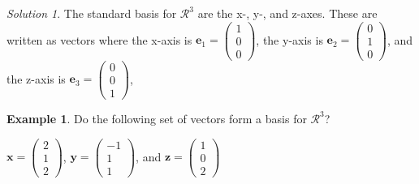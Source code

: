 \documentclass[
]{book}
\theoremstyle{definition}
\theoremstyle{definition}
\newtheorem{example}{Example}[chapter]
\theoremstyle{definition}
\theoremstyle{definition}
\theoremstyle{remark}
\newtheorem*{solution}{Solution}
\begin{document}
\begin{solution}
The standard basis for \(\mathcal{R}^3\) are the x-, y-, and z-axes. These are written as vectors where the x-axis is \(\mathbf{e}_1 = \begin{pmatrix} 1 \\ 0 \\ 0 \end{pmatrix}\), the y-axis is \(\mathbf{e}_2 = \begin{pmatrix} 0 \\ 1 \\ 0 \end{pmatrix}\), and the z-axis is \(\mathbf{e}_3 = \begin{pmatrix} 0 \\ 0 \\ 1\end{pmatrix}\),
\end{solution}

\begin{example}
Do the following set of vectors form a basis for \(\mathcal{R}^3\)?

\(\mathbf{x} = \begin{pmatrix} 2 \\ 1 \\ 2 \end{pmatrix}\), \(\mathbf{y} = \begin{pmatrix} -1 \\ 1 \\ 1 \end{pmatrix}\), and \(\mathbf{z} = \begin{pmatrix} 1 \\ 0 \\ 2 \end{pmatrix}\)
\end{example}
\end{document}
